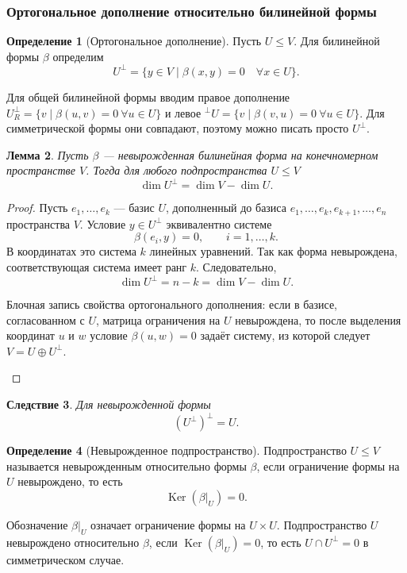 \documentclass[12pt,a4paper]{article}
\theoremstyle{definition}
\newtheorem{definition}{Определение}[section]
\theoremstyle{plain}
\newtheorem{lemma}[definition]{Лемма}
\newtheorem{corollary}[definition]{Следствие}
\theoremstyle{remark}
\newenvironment{knowledgefix}{\begin{clarifybox}}{\end{clarifybox}}
\newcommand{\Ker}{\operatorname{Ker}}
\begin{document}
\subsubsection*{Ортогональное дополнение относительно билинейной формы}

\begin{definition}[Ортогональное дополнение]
Пусть $U\le V$. Для билинейной формы $\beta$ определим
\[
    U^\perp=\{y\in V\mid \beta(x,y)=0\quad \forall x\in U\}.
\]
\begin{knowledgefix}
Для общей билинейной формы вводим правое дополнение \(U^\perp_R=\{v\mid \beta(u,v)=0\ \forall u\in U\}\) и левое \({}^\perp U=\{v\mid \beta(v,u)=0\ \forall u\in U\}\). Для симметрической формы они совпадают, поэтому можно писать просто \(U^\perp\).
\end{knowledgefix}
\end{definition}

\begin{lemma}
Пусть $\beta$ --- невырожденная билинейная форма на конечномерном пространстве $V$.
Тогда для любого подпространства $U\le V$
\[
    \dim U^\perp=\dim V-\dim U.
\]
\end{lemma}

\begin{proof}
Пусть $e_1,\ldots,e_k$ --- базис $U$, дополненный до базиса
$e_1,\ldots,e_k,e_{k+1},\ldots,e_n$ пространства $V$.
Условие $y\in U^\perp$ эквивалентно системе
\[
    \beta(e_i,y)=0,
    \qquad i=1,\ldots,k.
\]
В координатах это система $k$ линейных уравнений.
Так как форма невырождена, соответствующая система имеет ранг $k$.
Следовательно,
\[
    \dim U^\perp=n-k=\dim V-\dim U.
\]
\begin{knowledgefix}
Блочная запись свойства ортогонального дополнения: если в базисе, согласованном с \(U\), матрица ограничения на \(U\) невырождена, то после выделения координат \(u\) и \(w\) условие \(\beta(u,w)=0\) задаёт систему, из которой следует \(V=U\oplus U^\perp\).
\end{knowledgefix}
\end{proof}

\begin{corollary}
Для невырожденной формы
\[
    (U^\perp)^\perp=U.
\]
\end{corollary}

\begin{definition}[Невырожденное подпространство]
Подпространство $U\le V$ называется невырожденным относительно формы $\beta$, если ограничение формы на $U$ невырождено, то есть
\[
    \Ker(\beta|_U)=0.
\]
\begin{knowledgefix}
Обозначение \(\beta|_U\) означает ограничение формы на \(U\times U\). Подпространство \(U\) невырождено относительно \(\beta\), если \(\Ker(\beta|_U)=0\), то есть \(U\cap U^\perp=0\) в симметрическом случае.
\end{knowledgefix}
\end{definition}
\end{document}

